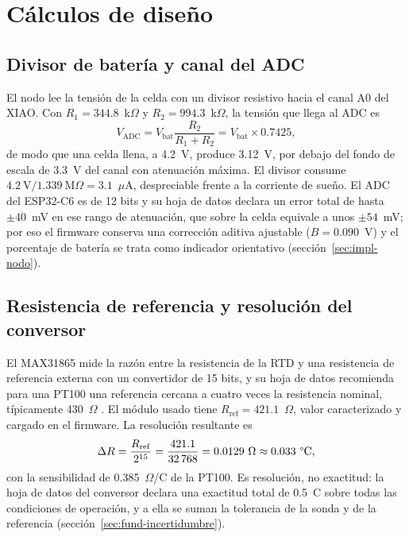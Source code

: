 \section{Cálculos de diseño}
\label{sec:fund-calculos}

\subsection{Divisor de batería y canal del ADC}
El nodo lee la tensión de la celda con un divisor resistivo hacia el canal A0 del XIAO. Con $R_1=344.8$~k$\Omega$ y $R_2=994.3$~k$\Omega$, la tensión que llega al ADC es
\begin{equation}
V_{\mathrm{ADC}}=V_{\mathrm{bat}}\frac{R_2}{R_1+R_2}=V_{\mathrm{bat}}\times0.7425,
\label{eq:fund-divisor}
\end{equation}
de modo que una celda llena, a 4.2~V, produce 3.12~V, por debajo del fondo de escala de 3.3~V del canal con atenuación máxima. El divisor consume $4.2~\mathrm{V}/1.339~\mathrm{M}\Omega=3.1$~$\mu$A, despreciable frente a la corriente de sueño. El ADC del ESP32-C6 es de 12 bits y su hoja de datos declara un error total de hasta $\pm40$~mV en ese rango de atenuación, que sobre la celda equivale a unos $\pm54$~mV; por eso el firmware conserva una corrección aditiva ajustable ($B=0.090$~V) y el porcentaje de batería se trata como indicador orientativo (sección~\ref{sec:impl-nodo}).

\subsection{Resistencia de referencia y resolución del conversor}
El MAX31865 mide la razón entre la resistencia de la RTD y una resistencia de referencia externa con un convertidor de 15 bits, y su hoja de datos recomienda para una PT100 una referencia cercana a cuatro veces la resistencia nominal, típicamente 430~$\Omega$ \citep{max31865}. El módulo usado tiene $R_{\mathrm{ref}}=421.1$~$\Omega$, valor caracterizado y cargado en el firmware. La resolución resultante es
\begin{equation}
\Delta R=\frac{R_{\mathrm{ref}}}{2^{15}}=\frac{421.1}{32\,768}=0.0129~\Omega\approx0.033~\text{\textdegree C},
\label{eq:fund-resolucion}
\end{equation}
con la sensibilidad de 0.385~$\Omega$/\textdegree C de la PT100. Es resolución, no exactitud: la hoja de datos del conversor declara una exactitud total de 0.5~\textdegree C sobre todas las condiciones de operación, y a ella se suman la tolerancia de la sonda y de la referencia (sección~\ref{sec:fund-incertidumbre}).

